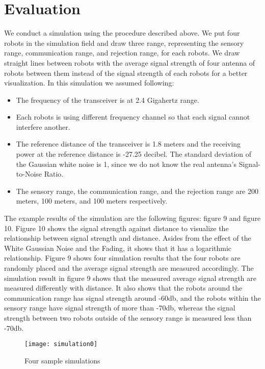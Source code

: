 \section{Evaluation}
\label{sec:evaluation}
\label{Simulation Result}
\indent 
	We conduct a simulation using the procedure described above. We put four robots in the simulation field and draw three range, representing the sensory range, communication range, and rejection range, for each robots. We draw straight lines between robots with the average signal strength of four antenna of robots between them instead of the signal strength of each robots for a better visualization. In this simulation we assumed following:
\begin{itemize}
	\item The frequency of the transceiver is at 2.4 Gigahertz range.
	\item Each robots is using different frequency channel so that each signal cannot interfere another.
	\item The reference distance of the transceiver is 1.8 meters and the receiving power at the reference distance is -27.25 decibel. The standard deviation of the Gaussian white noise is 1, since we do not know the real antenna's Signal-to-Noise Ratio.
	\item The sensory range, the communication range, and the rejection range are 200 meters, 100 meters, and 100 meters respectively.
\end{itemize}
\par
	The example results of the simulation are the following figures: figure 9 and figure 10. Figure 10 shows the signal strength against distance to visualize the relationship between signal strength and distance. Asides from the effect of the White Gaussian Noise and the Fading, it shows that it has a logarithmic relationship. Figure 9 shows four simulation results that the four robots are randomly placed and the average signal strength are measured accordingly. The simulation result in figure 9 shows that the measured average signal strength are measured differently with distance. It also shows that the robots around the communication range has signal strength around -60db, and the robots within the sensory range have signal strength of more than -70db, whereas the signal strength between two robots outside of the sensory range is measured less than -70db. \\
 
\begin{figure}[ht]
	\centering
	\texttt{[image: simulation0]}
	\caption{Four sample simulations}
	\end{figure}
	
